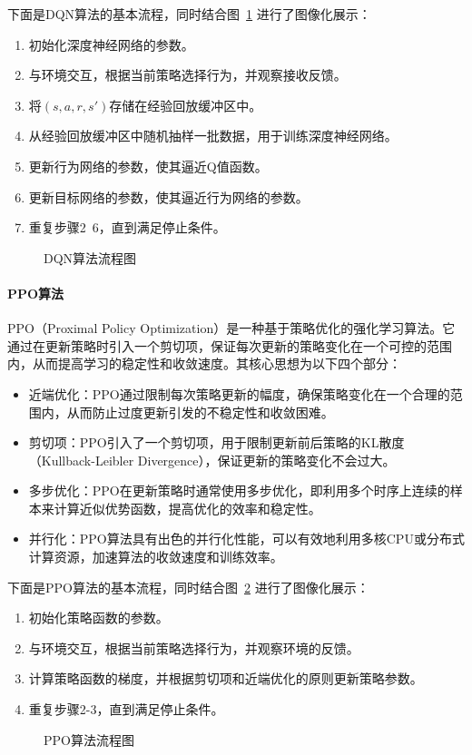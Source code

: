 下面是DQN算法的基本流程，同时结合图~\ref{fig:dqn} 进行了图像化展示：
\begin{enumerate}
    \item 初始化深度神经网络的参数。
    \item 与环境交互，根据当前策略选择行为，并观察接收反馈。
    \item 将$(s, a, r, s')$存储在经验回放缓冲区中。
    \item 从经验回放缓冲区中随机抽样一批数据，用于训练深度神经网络。
    \item 更新行为网络的参数，使其逼近Q值函数。
    \item 更新目标网络的参数，使其逼近行为网络的参数。
    \item 重复步骤2~6，直到满足停止条件。
\end{enumerate}
\begin{figure}[!htb]
    \centering
    
    \caption{DQN算法流程图}
    \label{fig:dqn}
\end{figure}

\paragraph{PPO算法}
PPO（Proximal Policy Optimization）是一种基于策略优化的强化学习算法\cite{schulman2017proximal}。它通过在更新策略时引入一个剪切项，保证每次更新的策略变化在一个可控的范围内，从而提高学习的稳定性和收敛速度。其核心思想为以下四个部分：
\begin{itemize}
    \item 近端优化：PPO通过限制每次策略更新的幅度，确保策略变化在一个合理的范围内，从而防止过度更新引发的不稳定性和收敛困难。
    \item 剪切项：PPO引入了一个剪切项，用于限制更新前后策略的KL散度（Kullback-Leibler Divergence），保证更新的策略变化不会过大。
    \item 多步优化：PPO在更新策略时通常使用多步优化，即利用多个时序上连续的样本来计算近似优势函数，提高优化的效率和稳定性。
    \item 并行化：PPO算法具有出色的并行化性能，可以有效地利用多核CPU或分布式计算资源，加速算法的收敛速度和训练效率。
\end{itemize}

下面是PPO算法的基本流程，同时结合图~\ref{fig:ppo} 进行了图像化展示：
\begin{enumerate}
    \item 初始化策略函数的参数。
    \item 与环境交互，根据当前策略选择行为，并观察环境的反馈。
    \item 计算策略函数的梯度，并根据剪切项和近端优化的原则更新策略参数。
    \item 重复步骤2-3，直到满足停止条件。
\end{enumerate}
\begin{figure}[!htb]
    \centering
    
    \caption{PPO算法流程图}
    \label{fig:ppo}
\end{figure}

